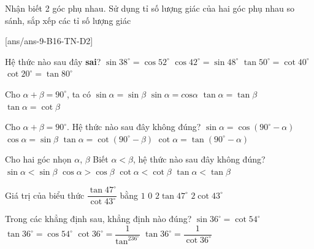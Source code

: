 \begin{dang}{ Nhận biết 2 góc phụ nhau. Sử dụng tỉ số lượng giác của hai góc phụ nhau so sánh, sắp xếp các tỉ số lượng giác}
\end{dang}
[ans/ans-9-B16-TN-D2]
\begin{ex}%
%
Hệ thức nào sau đây \textbf{sai}?
\choice
{$\sin 38^\circ=\cos \text{52}^\circ$}
{$\cos \text{42}^\circ=\sin 48^\circ$}
{$\tan 50^\circ=\cot 40^\circ$}
{\True $\cot 20^\circ=\tan 80^\circ$}
\end{ex}
\begin{ex}%
	Cho $\alpha+\beta=90^\circ$, ta có
	\choice
	{$\sin \alpha=\sin \beta$}
	{$\sin \alpha=c\mathrm{os}\alpha$}
	{$\tan \alpha=\tan \beta$}
	{\True $\tan \alpha=\cot \beta$}
\end{ex}
\begin{ex}%
	Cho $\alpha+\beta=90^\circ$. Hệ thức nào sau đây không đúng?
	\choice
	{$\sin \alpha=\cos \left(90^\circ-\alpha\right)$}
	{$\cos \alpha=\sin \beta$}
	{\True $\tan \alpha=\cot \left(90^\circ-\beta\right)$}
	{$\cot \alpha=\tan \left(90^\circ-\alpha\right)$}
\end{ex}
\begin{ex}%
	Cho hai góc nhọn $\alpha$, $\beta$ Biết $\alpha < \beta$, hệ thức nào sau đây không đúng?
	\choice
	{$\sin \alpha < \sin \beta$}
	{$\cos \alpha > \cos \beta$}
	{\True $\cot \alpha < \cot \beta$}
	{$\tan \alpha < \tan \beta$}
\end{ex}
\begin{ex}%
	Giá trị của biểu thức $\dfrac{\tan 47^\circ}{\cot 43^\circ}$ bằng
	\choice
	{\True $1$}
	{$0$}
	{$2\tan 47^\circ$}
	{$2\cot 43^\circ$}
\end{ex}
\begin{ex}%
	Trong các khẳng định sau, khẳng định nào đúng?
	\choice
	{$\sin 36^\circ=\cot 54^\circ$}
	{$\tan 36^\circ=\cos 54^\circ$}
	{$\cot 36^\circ=\dfrac{1}{\tan^236^\circ}$}
	{\True $\tan 36^\circ=\dfrac{1}{\cot 36^\circ}$}
\end{ex}
